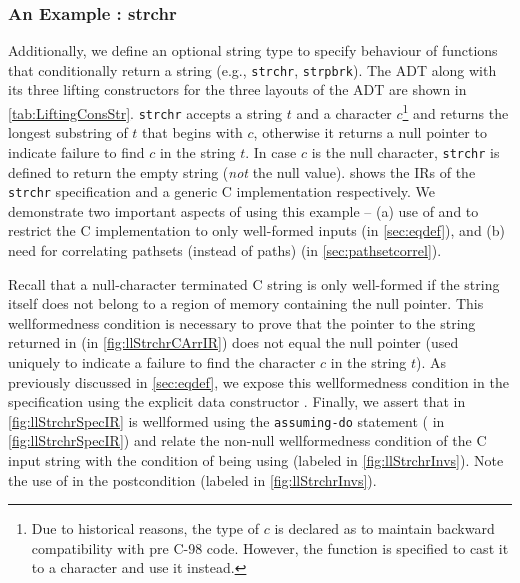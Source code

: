 \subsubsection{An Example : strchr}
\label{sec:strchrexample}
Additionally, we define an optional string type  to specify
behaviour of functions that conditionally return a string (e.g., {\tt strchr}, {\tt strpbrk}).
The  ADT along with its three lifting constructors for the three layouts of the  ADT
are shown in \cref{tab:LiftingConsStr}.
{\tt strchr} accepts a string $t$ and a character $c$\footnote{Due to historical reasons,
the type of $c$ is declared as 
to maintain backward compatibility with pre C-98 code.
However, the function is specified to cast it to a character and use it instead.} and returns
the longest substring of $t$ that begins with $c$, otherwise it returns a null pointer to indicate
failure to find $c$ in the string $t$.
In case $c$ is the null character, {\tt strchr} is defined to return the empty string ({\em not} the null value).
 shows the IRs of the {\tt strchr} \SpecL{} specification and
a generic C implementation respectively.
We demonstrate two important aspects of \toolName{} using this example -- (a) use of \sdef{} and \pre{} to restrict the C implementation
to only well-formed inputs (in \cref{sec:eqdef}),
and (b) need for correlating pathsets (instead of paths) (in \cref{sec:pathsetcorrel}).

Recall that a null-character terminated C string is only well-formed if the string itself does not belong to a region of memory containing the null pointer.
This wellformedness condition is necessary to prove that the pointer to the string returned in  (in \cref{fig:llStrchrCArrIR})
does not equal the null pointer (used uniquely to indicate a failure to find the character $c$ in the string $t$).
As previously discussed in \cref{sec:eqdef}, we expose this wellformedness condition in the specification using
the explicit  data constructor .
Finally, we assert that  in \cref{fig:llStrchrSpecIR} is wellformed using the {\tt assuming-do} statement
( in \cref{fig:llStrchrSpecIR}) and relate the non-null wellformedness condition of the C input string 
with the condition of  being  using \pre{} (labeled  in \cref{fig:llStrchrInvs}).
Note the use of  in the postcondition (labeled  in \cref{fig:llStrchrInvs}).

